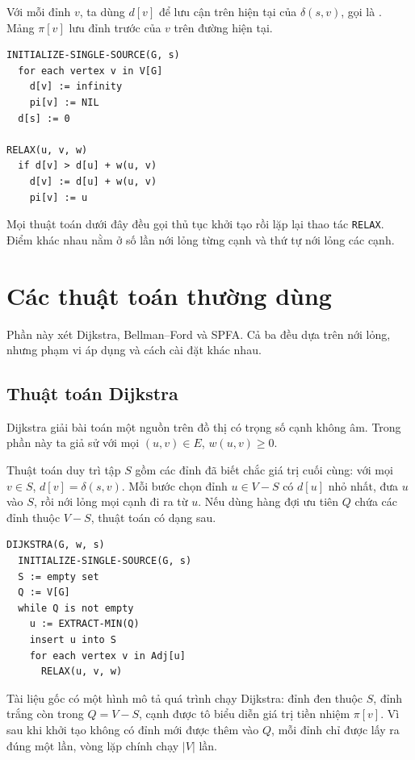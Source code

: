 \documentclass[11pt]{article}
\begin{document}
Với mỗi đỉnh \(v\), ta dùng \(d[v]\) để lưu cận trên hiện tại của
\(\delta(s,v)\), gọi là . Mảng
\(\pi[v]\) lưu đỉnh trước của \(v\) trên đường hiện tại.

\begin{verbatim}
INITIALIZE-SINGLE-SOURCE(G, s)
  for each vertex v in V[G]
    d[v] := infinity
    pi[v] := NIL
  d[s] := 0

RELAX(u, v, w)
  if d[v] > d[u] + w(u, v)
    d[v] := d[u] + w(u, v)
    pi[v] := u
\end{verbatim}

Mọi thuật toán dưới đây đều gọi thủ tục khởi tạo rồi lặp lại thao tác
\texttt{RELAX}. Điểm khác nhau nằm ở số lần nới lỏng từng cạnh và thứ tự nới
lỏng các cạnh.

\section{Các thuật toán thường dùng}

Phần này xét Dijkstra, Bellman--Ford và SPFA. Cả ba đều dựa trên nới lỏng,
nhưng phạm vi áp dụng và cách cài đặt khác nhau.

\subsection{Thuật toán Dijkstra}

Dijkstra giải bài toán một nguồn trên đồ thị có trọng số cạnh không âm. Trong
phần này ta giả sử với mọi \((u,v)\in E\), \(w(u,v)\ge 0\).

Thuật toán duy trì tập \(S\) gồm các đỉnh đã biết chắc giá trị cuối cùng:
với mọi \(v\in S\), \(d[v]=\delta(s,v)\). Mỗi bước chọn đỉnh
\(u\in V-S\) có \(d[u]\) nhỏ nhất, đưa \(u\) vào \(S\), rồi nới lỏng mọi cạnh
đi ra từ \(u\). Nếu dùng hàng đợi ưu tiên \(Q\) chứa các đỉnh thuộc \(V-S\),
thuật toán có dạng sau.

\begin{verbatim}
DIJKSTRA(G, w, s)
  INITIALIZE-SINGLE-SOURCE(G, s)
  S := empty set
  Q := V[G]
  while Q is not empty
    u := EXTRACT-MIN(Q)
    insert u into S
    for each vertex v in Adj[u]
      RELAX(u, v, w)
\end{verbatim}

Tài liệu gốc có một hình mô tả quá trình chạy Dijkstra: đỉnh đen thuộc \(S\),
đỉnh trắng còn trong \(Q=V-S\), cạnh được tô biểu diễn giá trị tiền nhiệm
\(\pi[v]\). Vì sau khi khởi tạo không có đỉnh mới được thêm vào \(Q\), mỗi
đỉnh chỉ được lấy ra đúng một lần, vòng lặp chính chạy \(|V|\) lần.
\end{document}
